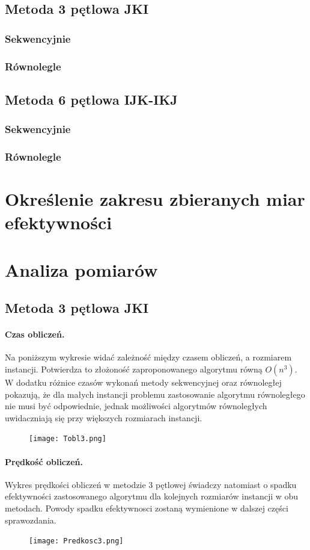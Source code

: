 \documentclass{scrartcl}
\begin{document}
\subsection{Metoda 3 pętlowa JKI}
\subsubsection{Sekwencyjnie}
\subsubsection{Równolegle}
\subsection{Metoda 6 pętlowa IJK-IKJ}
\subsubsection{Sekwencyjnie}
\subsubsection{Równolegle}
\section{Określenie zakresu zbieranych miar efektywności}
\section{Analiza pomiarów}
\subsection{Metoda 3 pętlowa JKI}
\paragraph{Czas obliczeń.} Na poniższym wykresie widać zależność między czasem obliczeń, a rozmiarem instancji. Potwierdza to złożoność zaproponowanego algorytmu równą $O(n^{3})$. W dodatku różnice czasów wykonań metody sekwencyjnej oraz równoległej pokazują, że dla małych instancji problemu zastosowanie algorytmu równoległego nie musi być odpowiednie, jednak możliwości algorytmów równoległych uwidaczniają się przy większych rozmiarach instancji.
\begin{figure}[H]
\texttt{[image: Tobl3.png]}\\
\end{figure}
\paragraph{Prędkość obliczeń.} Wykres prędkości obliczeń w metodzie 3 pętlowej świadczy natomiast o spadku efektywności zastosowanego algorytmu dla kolejnych rozmiarów instancji w obu metodach. Powody spadku efektywnosci zostaną wymienione w dalszej części sprawozdania.
\begin{figure}[H]
\texttt{[image: Predkosc3.png]}\\
\end{figure}
\end{document}
